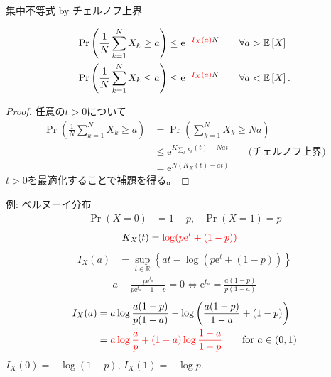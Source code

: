 \documentclass[lualatex,handout]{beamer}
\newcommand{\mycolor}[2]{%
  \begingroup
  \colorlet{currentcolor}{.}%
  \color{#1}#2%
  \color{currentcolor}%
  \endgroup
}
\newcommand{\emm}[1]{\mycolor{red}{#1}}
\newcommand{\expt}[1]{\mathbb{E}\left[#1\right]}
\theoremstyle{definition}
\begin{document}
\begin{frame}{集中不等式 by チェルノフ上界}
\small
\begin{theorem}[集中不等式]
\vspace{-1em}
\begin{align*}
\Pr\left(\frac1N\sum_{k=1}^N X_k\ge a\right) &\le \mathrm{e}^{-\emm{I_X(a)}N}\qquad\forall a>\expt{X}\\
\Pr\left(\frac1N\sum_{k=1}^N X_k\le a\right) &\le \mathrm{e}^{-\emm{I_X(a)}N}\qquad\forall a<\expt{X}.
\end{align*}
\end{theorem}
\begin{proof}
任意の$t>0$について
\begin{align*}
\Pr\left(\frac1N\sum_{k=1}^N X_k\ge a\right) &=
\Pr\left(\sum_{k=1}^N X_k\ge Na\right)\\
&\le\mathrm{e}^{K_{\sum_k X_k}(t) - Nat}\qquad\text{(チェルノフ上界)}\\
&=\mathrm{e}^{N(K_X(t) - at)}
\end{align*}
$t>0$を最適化することで補題を得る。
\end{proof}
\end{frame}



\begin{frame}{例: ベルヌーイ分布}
\begin{align*}
\Pr(X=0) &= 1-p,&\Pr(X=1)=p
\end{align*}
\begin{align*}
K_X(t) &= \emm{\log(p\mathrm{e}^t + (1-p))}
\end{align*}
\begin{align*}
I_X(a) &= \sup_{t\in\mathbb{R}} \left\{ at - \log(p\mathrm{e}^t+(1-p))\right\}
\end{align*}
\begin{align*}
a - \frac{p\mathrm{e}^{t_a}}{p\mathrm{e}^{t_a}+1-p} = 0
\iff \mathrm{e}^{t_a} = \frac{a(1-p)}{p(1-a)}
\end{align*}
\begin{align*}
I_X(a) &= a\log\frac{a(1-p)}{p(1-a)} - \log\left(\frac{a(1-p)}{1-a} + (1-p)\right)\\
 &= \emm{a\log\frac{a}{p} + (1-a)\log\frac{1-a}{1-p}} \qquad\text{for } a\in(0,1)
\end{align*}
$I_X(0) = -\log(1-p)$, $I_X(1) = -\log p$.
\end{frame}
\end{document}
